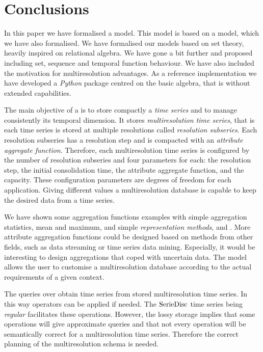 \section{Conclusions}
\label{sec:concl-future-work}

In this paper we have formalised a  model. This model is
based on a  model, which we have also formalised.  We have
formalised our models based on set theory, heavily inspired on
relational algebra. We have gone a bit further and proposed
 including set, sequence and temporal function
behaviour. We have also included the motivation for multiresolution
advantages.  As a reference implementation we have developed a
\emph{Python} package centred on the basic algebra, that is without
extended  capabilities.



The main objective of a  is to store compactly a \emph{time
series} and to manage consistently its temporal dimension.  It stores
\emph{multiresolution time series}, that is each time series is stored at
multiple resolutions called \emph{resolution subseries}.  Each resolution
subseries has a resolution step and is compacted with an \emph{attribute
aggregate function}. Therefore, each multiresolution time series is
configured by the number of resolution subseries and four parameters
for each: the resolution step, the initial consolidation time, the
attribute aggregate function, and the capacity.  These configuration
parameters are degrees of freedom for each application. Giving
different values a multiresolution database is capable to keep the
desired data from a time series. %

We have shown some aggregation functions examples with simple
aggregation statistics, mean and maximum, and simple \emph{representation
methods}, \dd{} and \zohe{}. More attribute aggregation functions could
be designed based on methods from other fields, such as data streaming
or time series data mining. Especially, it would be interesting to
design aggregations that coped with uncertain data.  The model allows
the user to customise a multiresolution database according to the
actual requirements of a given context.

The queries over  obtain time series from stored
multiresolution time series. In this way  operators can be
applied if needed. The $\operatorname{SerieDisc}$ time series being \emph{regular}
facilitates these operations. However, the lossy storage implies that
some operations will give approximate queries and that not every
 operation will be semantically correct for a
multiresolution time series. Therefore the correct planning of the
multiresolution schema is needed.

